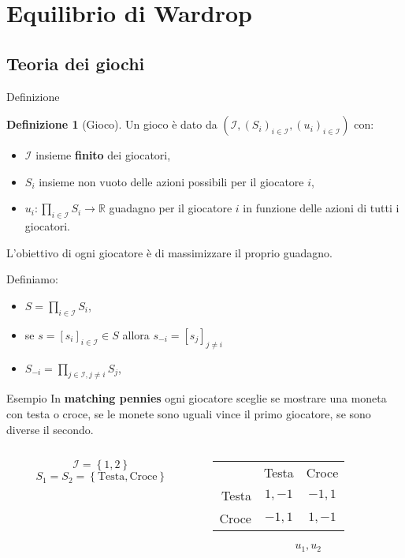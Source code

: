 \documentclass{beamer}
\newcounter{counter1}
\theoremstyle{plain}
\theoremstyle{definition}
\newtheorem{mydef}[counter1]{Definizione}
\theoremstyle{remark}
\newcommand{\set}[1]{\left\{#1\right\}}
\newcommand{\pa}[1]{\left(#1\right)}
\newcommand{\bra}[1]{\left[#1\right]}
\begin{document}
\section{Equilibrio di Wardrop}

\subsection{Teoria dei giochi}

\begin{frame}{Definizione}
  \begin{mydef}[Gioco]%
    Un gioco è dato da $\pa{\mathcal{I},\pa{S_i}_{i\in\mathcal{I}},
      \pa{u_i}_{i\in\mathcal{I}}}$ con:
    \begin{itemize}
    \item $\mathcal{I}$ insieme \textbf{finito} dei giocatori,
    \item $S_i$ insieme non vuoto delle azioni possibili per il
      giocatore $i$,
    \item $u_i: \prod _{i\in\mathcal{I}} S_i \to \mathbb{R}$ guadagno
      per il giocatore $i$ in funzione delle azioni di tutti i
      giocatori.
    \end{itemize}
  \end{mydef}
  L'obiettivo di ogni giocatore è di massimizzare il proprio guadagno.

  Definiamo:
  \begin{itemize}
  \item $S = \prod _{i\in\mathcal{I}} S_i$,
  \item se $s = \bra{s_i}_{i\in\mathcal{I}} \in S$ allora $s_{-i} =
    \bra{s_j}_{j\neq i}$
  \item $\displaystyle S_{-i} = \prod _{j\in\mathcal{I},j\neq i} S_j$,
  \end{itemize}
\end{frame}

\begin{frame}{Esempio}
  In \textbf{matching pennies} ogni giocatore sceglie se mostrare una
  moneta con testa o croce, se le monete sono uguali vince il primo
  giocatore, se sono diverse il secondo.
  
  \begin{columns}[T]
    \begin{column}{0.4\textwidth}
      \[ \mathcal{I} = \set{1,2} \]
      \[ S_1 = S_2 = \set{\text{Testa},\text{Croce}} \]
    \end{column}
    \begin{column}{0.4\textwidth}
      \begin{tabular}{rcc}
        & Testa & Croce \\
        \cline{2-3}
        Testa & \multicolumn{1}{|c|}{$1,-1$} & \multicolumn{1}{|c|}{$-1,1$}  \\
        \cline{2-3}
        Croce & \multicolumn{1}{|c|}{$-1,1$} & \multicolumn{1}{|c|}{$1,-1$}  \\
        \cline{2-3}
      \end{tabular}
      \[ u_1,u_2 \]
    \end{column}
  \end{columns}
\end{frame}
\end{document}
